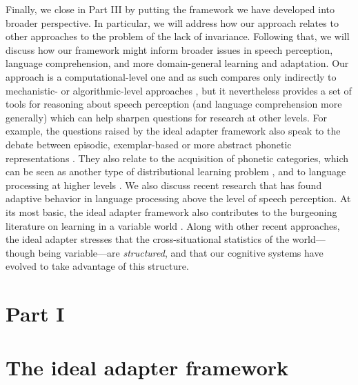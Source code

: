 Finally, we close in Part III by putting the framework we have developed into broader perspective.  In particular, we will address how our approach relates to other approaches to the problem of the lack of invariance.  Following that, we will discuss how our framework might inform broader issues in speech perception, language comprehension, and more domain-general learning and adaptation. Our approach is a computational-level one and as such compares only indirectly to mechanistic- or algorithmic-level approaches \autocite{Marr1982}, but it nevertheless provides a set of tools for reasoning about speech perception (and language comprehension more generally) which can help sharpen questions for research at other levels.  For example, the questions raised by the ideal adapter framework also speak to the debate between episodic, exemplar-based or more abstract phonetic representations \autocite{Johnson1997,Goldinger1998,McClelland1986,Norris2008,Pierrehumbert2003}. They also relate to the acquisition of phonetic categories, which can be seen as another type of distributional learning problem \autocite{Maye2002,McMurray2009,Vallabha2007}, and to language processing at higher levels \autocite[e.g.,][]{Fine2013,Grodner2011,Kamide2012,Kurumada2012,Kurumada2014}.  We also discuss recent research that has found adaptive behavior in language processing above the level of speech perception. At its most basic, the ideal adapter framework also contributes to the burgeoning literature on learning in a variable world \autocites[e.g., change detection][]{Gallistel2001}[hierarchical reinforcement learning][]{Botvinick2012}[motor learning][]{Kording2007a}.  Along with other recent approaches, the ideal adapter stresses that the cross-situational statistics of the world---though being variable---are \emph{structured}, and that our cognitive systems have evolved to take advantage of this structure.
\label{r2-outline-parts-end} 

\section*{Part I}
\label{sec:part-i}

\section{The ideal adapter framework}
\label{sec:framework}

